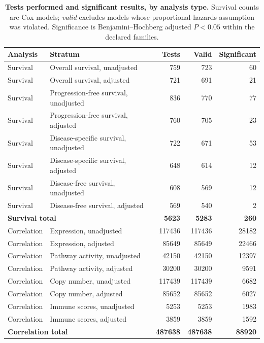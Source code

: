 \documentclass[11pt]{article}
\begin{document}
\begin{table}[htbp]
\centering
\caption{\textbf{Tests performed and significant results, by analysis type.}
Survival counts are Cox models; \emph{valid} excludes models whose
proportional-hazards assumption was violated. Significance is
Benjamini--Hochberg adjusted $P < 0.05$ within the declared families.}
\label{tab:s8}
\small
\begin{tabular}{llrrr}
\toprule
Analysis & Stratum & Tests & Valid & Significant \\
\midrule
Survival & Overall survival, unadjusted & 759 & 723 & 60 \\
Survival & Overall survival, adjusted & 721 & 691 & 21 \\
Survival & Progression-free survival, unadjusted & 836 & 770 & 77 \\
Survival & Progression-free survival, adjusted & 760 & 705 & 23 \\
Survival & Disease-specific survival, unadjusted & 722 & 671 & 53 \\
Survival & Disease-specific survival, adjusted & 648 & 614 & 12 \\
Survival & Disease-free survival, unadjusted & 608 & 569 & 12 \\
Survival & Disease-free survival, adjusted & 569 & 540 & 2 \\
\midrule
\multicolumn{2}{l}{\textbf{Survival total}} & \textbf{\num{5623}} & \textbf{\num{5283}} & \textbf{260} \\
\midrule
Correlation & Expression, unadjusted & \num{117436} & \num{117436} & \num{28182} \\
Correlation & Expression, adjusted & \num{85649} & \num{85649} & \num{22466} \\
Correlation & Pathway activity, unadjusted & \num{42150} & \num{42150} & \num{12397} \\
Correlation & Pathway activity, adjusted & \num{30200} & \num{30200} & \num{9591} \\
Correlation & Copy number, unadjusted & \num{117439} & \num{117439} & \num{6682} \\
Correlation & Copy number, adjusted & \num{85652} & \num{85652} & \num{6027} \\
Correlation & Immune scores, unadjusted & \num{5253} & \num{5253} & \num{1983} \\
Correlation & Immune scores, adjusted & \num{3859} & \num{3859} & \num{1592} \\
\midrule
\multicolumn{2}{l}{\textbf{Correlation total}} & \textbf{\num{487638}} & \textbf{\num{487638}} & \textbf{\num{88920}} \\
\bottomrule
\end{tabular}
\end{table}
\end{document}
